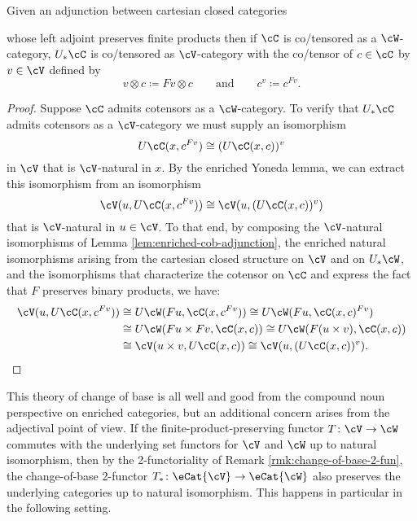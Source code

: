 \begin{proposition}\label{prop:cob-adjunction}
Given an adjunction between cartesian closed categories
\begin{center}
\end{center}
whose left adjoint preserves finite products then if $\cC$ is co/tensored as a $\cW$-cat\-e\-gory,  $U_*\cC$ is co/tensored as $\cV$-category with the co/tensor of $c \in \cC$ by $v \in \cV$ defined by
\[ v \otimes c \coloneq Fv \otimes c \qquad \text{and} \qquad c^v \coloneq c^{Fv}.\]
\end{proposition}
\begin{proof}
Suppose $\cC$ admits cotensors as a $\cW$-category. To verify that $U_*\cC$ admits cotensors as a $\cV$-category we must supply an isomorphism
\[ U\cC(x,c^{Fv}) \cong (U\cC(x,c))^v\] in $\cV$ that is $\cV$-natural in $x$. By the enriched Yoneda lemma, we can extract this isomorphism from an isomorphism \[ \cV(u,U\cC(x,c^{Fv})) \cong \cV(u,(U\cC(x,c))^v)\] that is $\cV$-natural in $u \in \cV$. To that end, by composing the $\cV$-natural isomorphisms of Lemma \ref{lem:enriched-cob-adjunction}, the enriched natural isomorphisms arising from the cartesian closed structure on $\cV$ and on $U_*\cW$, and the isomorphisms that characterize the cotensor on $\cC$ and express the fact that $F$ preserves binary products, we have:
\begin{align*} \cV(u,U\cC(x,c^{Fv})) &\cong U\cW(Fu, \cC(x,c^{Fv})) \cong U\cW(Fu, \cC(x,c)^{Fv}) \\ &\cong U\cW(Fu \times Fv, \cC(x,c))  \cong U\cW(F(u \times v), \cC(x,c)) \\ &\cong \cV(u \times v, U\cC(x,c)) \cong \cV(u, (U\cC(x,c))^v). \qedhere\end{align*}
\end{proof}



This theory of change of base is all well and good from the compound noun perspective on enriched categories, but an additional concern arises from the adjectival point of view. If the finite-product-preserving functor $T \colon \cV \to \cW$ commutes with the underlying set functors for $\cV$ and $\cW$ up to natural isomorphism, then by the 2-functoriality of Remark \ref{rmk:change-of-base-2-fun}, the change-of-base 2-functor $T_* \colon \eCat{\cV} \to \eCat{\cW}$ also preserves the underlying categories up to natural isomorphism. This happens in particular in the following setting.


